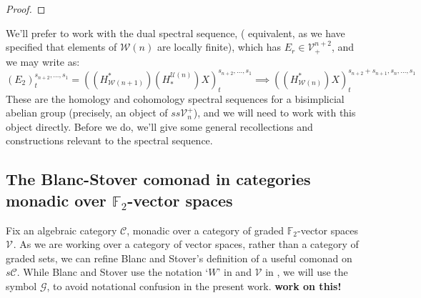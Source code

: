 \documentclass[11pt]{amsart}
\theoremstyle{plain}
\theoremstyle{definition}
\newcommand{\scrG}{\mathscr{G}}
\newcommand{\scrV}{\mathscr{V}}
\newcommand{\calW}{\mathcal{W}}
\newcommand{\calU}{\mathcal{U}}
\newcommand{\calC}{\mathcal{C}}
\newcommand{\calV}{\mathcal{V}}
\theoremstyle{plain}
\newcommand{\vect}[2]{\calV^{#1}_{#2}}
\newcommand{\BSW}{{\scrG}}
\newcommand{\F}{\mathbb{F}}
\begin{document}
\begin{Composite functor spectral sequences}
\begin{proof}
\end{proof}
We'll prefer to work with the dual spectral sequence, ( equivalent, as we have specified that elements of $\calW(n)$ are locally finite), which has $E_r\in\vect{n+2}{+}$, and we may write as:
\[(E_2)^{s_{n+2},\ldots,s_1}_t=((H^*_{\calW(n+1)})(H_*^{\calU(n)})X)^{s_{n+2},\ldots,s_1}_t\implies ((H^*_{\calW(n)})X)^{s_{n+2}+s_{n+1},s_n,\ldots,s_1}_t\]
These are the homology and cohomology spectral sequences for a bisimplicial abelian group (precisely, an object of $ss\vect{+}{n}$), and we will need to work with this object directly. Before we do, we'll give some general recollections and constructions relevant to the spectral sequence.

\subsection{The Blanc-Stover comonad in categories monadic over $\F_2$-vector spaces}
Fix an algebraic category $\calC$, monadic over a category of graded $\F_2$-vector spaces $\vect{}{}$. %
As we are working over a category of vector spaces, rather than a category of graded sets, we can refine Blanc and Stover's definition  of a useful comonad on $s\calC$. While Blanc and Stover use the notation `$W$' in \cite{Blanc_Stover-Groth_SS.pdf} and $\scrV$ in \cite{StoverVanKampen.pdf}, we will use the symbol $\BSW$, to avoid notational confusion in the present work. \textbf{{work on this!}}


\end{Composite functor spectral sequences}
\end{document}
